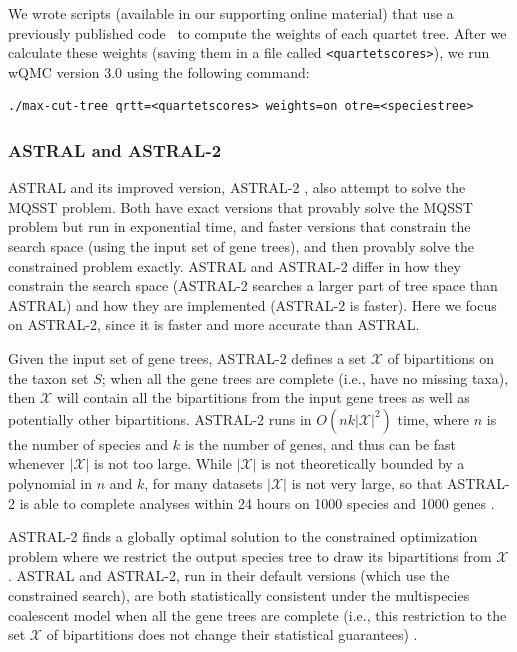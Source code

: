 We wrote scripts (available in our supporting online  material)
that use a previously published code~\cite{JohansenThesis}
to compute the weights of each quartet tree.
After we calculate these weights (saving them in a 
file called {\tt <quartetscores>}),
we run wQMC version 3.0 using the following command:
\begin{verbatim}
./max-cut-tree qrtt=<quartetscores> weights=on otre=<speciestree>
\end{verbatim}

\subsubsection{ASTRAL and ASTRAL-2}
ASTRAL \cite{Astral} and 
its improved version, 
ASTRAL-2 \cite{Astral2}, 
also attempt to solve the MQSST problem.
Both have exact versions that provably solve the
MQSST problem but run in exponential time, and faster
versions that constrain the search space (using the input
set of gene trees), and then provably solve the
constrained problem exactly.
ASTRAL and ASTRAL-2 differ in
how they constrain the search space (ASTRAL-2 searches
a larger part of tree space than ASTRAL)  and how
they are implemented (ASTRAL-2 is faster). 
Here we focus on ASTRAL-2, since it is faster
and more accurate than ASTRAL. 

Given
the input set of gene trees, ASTRAL-2 defines a set $\mathcal{X}$ of
bipartitions on the taxon set $S$; when all the gene trees are
complete (i.e., have no missing taxa), then $\mathcal{X}$ will 
contain all the bipartitions from the input gene trees as well as potentially
other
bipartitions.
ASTRAL-2 runs in $O(n k |\mathcal{X}|^2)$ time, where
$n$ is the number of species and $k$ is the number of genes, and thus
can be fast whenever $|\mathcal{X}|$ is not too large.
While $|\mathcal{X}|$ is not theoretically bounded by
a polynomial in $n$ and $k$, 
for many datasets $|\mathcal{X}|$ is
not very large, so that
ASTRAL-2 is able to complete analyses 
within 24 hours  on 
1000 species and 1000 genes \cite{Astral2}.

ASTRAL-2
finds a globally optimal solution to the constrained optimization problem
where we restrict the output species tree to draw its bipartitions
from $\mathcal{X}$. 
ASTRAL and ASTRAL-2, run in their default versions (which
use the constrained search),  are both
statistically consistent under the multispecies
coalescent model when all the gene trees are complete (i.e.,  this restriction
to the set $\mathcal{X}$ of bipartitions does not change
their statistical guarantees) \cite{Astral2}.

